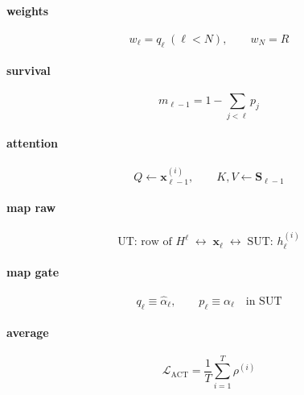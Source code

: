 \documentclass{article}
\begin{document}
\paragraph{weights}
\[
w_{\ell}=q_{\ell}\;(\ell<N),\qquad w_N=R
\]

\paragraph{survival}
\[
m_{\ell-1}=1-\sum_{j<\ell}p_j
\]

\paragraph{attention}
\[
Q\leftarrow\mathbf{x}_{\ell-1}^{(i)},\qquad K,V\leftarrow\mathbf{S}_{\ell-1}
\]

\paragraph{map raw}
\[
\text{UT: row of }H^{\ell}\;\longleftrightarrow\;\mathbf{x}_{\ell}\;\longleftrightarrow\;\text{SUT: }h_{\ell}^{(i)}
\]

\paragraph{map gate}
\[
q_{\ell}\equiv\hat\alpha_{\ell},\qquad p_{\ell}\equiv\alpha_{\ell}\quad\text{in SUT}
\]

\paragraph{average}
\[
\mathcal{L}_{\mathrm{ACT}}=\frac{1}{T}\sum_{i=1}^{T}\rho^{(i)}
\]
\end{document}

